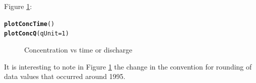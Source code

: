 \documentclass[a4paper,11pt]{article}\usepackage[]{graphicx}\usepackage[]{color}
\makeatletter
\newcommand{\hlnum}[1]{\textcolor[rgb]{0.686,0.059,0.569}{#1}}%
\newcommand{\hlstd}[1]{\textcolor[rgb]{0.345,0.345,0.345}{#1}}%
\newcommand{\hlkwc}[1]{\textcolor[rgb]{0.333,0.667,0.333}{#1}}%
\newcommand{\hlkwd}[1]{\textcolor[rgb]{0.737,0.353,0.396}{\textbf{#1}}}%
\newenvironment{kframe}{%
 \def\at@end@of@kframe{}%
 \ifinner\ifhmode%
  \def\at@end@of@kframe{\end{minipage}}%
  \begin{minipage}{\columnwidth}%
 \fi\fi%
 \def\FrameCommand##1{\hskip\@totalleftmargin \hskip-\fboxsep
 \colorbox{shadecolor}{##1}\hskip-\fboxsep
     \hskip-\linewidth \hskip-\@totalleftmargin \hskip\columnwidth}%
 \MakeFramed {\advance\hsize-\width
   \@totalleftmargin\z@ \linewidth\hsize
   \@setminipage}}%
 {\par\unskip\endMakeFramed%
 \at@end@of@kframe}
\newenvironment{knitrout}{}{} %
\makeatother
\begin{document}
Figure \ref{fig:plotConcTime}:
\begin{knitrout}
\color{fgcolor}\begin{kframe}
\begin{alltt}
\hlkwd{plotConcTime}\hlstd{()}
\hlkwd{plotConcQ}\hlstd{(}\hlkwc{qUnit}\hlstd{=}\hlnum{1}\hlstd{)}
\end{alltt}
\end{kframe}\begin{figure}[]
\caption[Concentration vs time or discharge]{Concentration vs time or discharge\label{fig:plotConcTime}}
\end{figure}


\end{knitrout}

It is interesting to note in Figure \ref{fig:plotConcTime} the change in the convention for rounding of data values that occurred around 1995.
\end{document}
